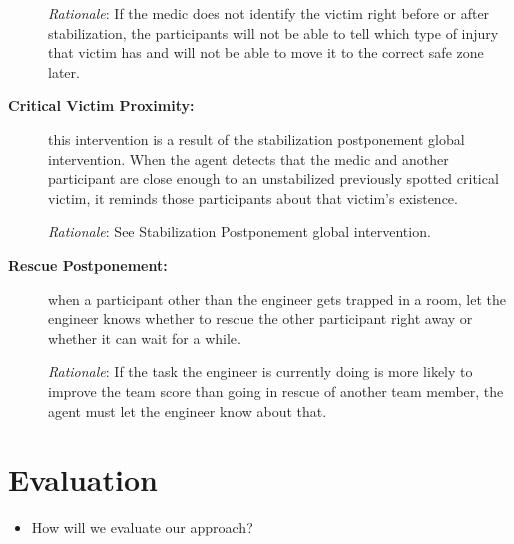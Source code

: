 \begin{description}
    \emph{Rationale}: If the medic does not identify the victim right before or after stabilization, the participants will not be able to tell which type of injury that victim has and will not be able to move it to the correct safe zone later.
    
    \item[\textbf{Critical Victim Proximity:}] this intervention is a result of the stabilization postponement global intervention. When the agent detects that the medic and another participant are close enough to an unstabilized previously spotted critical victim, it reminds those participants about that victim's existence.
        
    \emph{Rationale}: See Stabilization Postponement global intervention.    
    
    \item[\textbf{Rescue Postponement:}] when a participant other than the engineer gets trapped in a room, let the engineer knows whether to rescue the other participant right away or whether it can wait for a while. 
        
    \emph{Rationale}: If the task the engineer is currently doing is more likely to improve the team score than going in rescue of another team member, the agent must let the engineer know about that.

\end{description}
 


%

\section{Evaluation}
\begin{itemize}
    \item How will we evaluate our approach?
\end{itemize}

